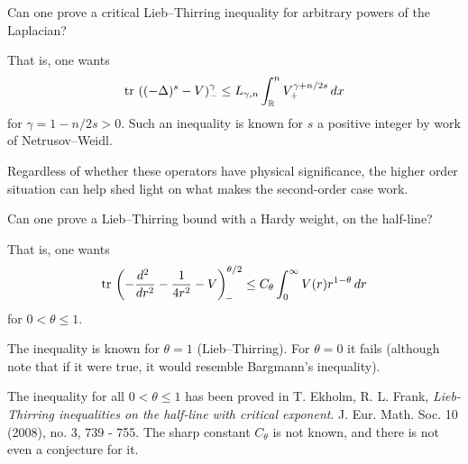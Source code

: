 \documentclass[12pt,letterpaper, reqno]{amsart}
\begin{document}
\begin{problemblock}

\begin{problem}
 Can one prove a critical Lieb--Thirring inequality for arbitrary powers of
the Laplacian?
\end{problem}

That is, one wants
\[
\text{tr\,} \left( (-\Delta)^s - V \right)_-^\gamma \leq
L_{\gamma,n} \int_\mathbb R^n V_+^{\gamma + n/2s} \, dx
\]
for $\gamma = 1 - n/2s > 0$. Such an inequality is known for $s$ a
positive integer by work of Netrusov--Weidl.


\begin{remark}
 Regardless of whether these operators have
physical significance, the higher order situation can help shed
light on what makes the second-order case work.
\end{remark}

\end{problemblock}


\begin{problemblock}

\begin{problem}
 Can one prove a Lieb--Thirring bound with a Hardy
weight, on the half-line?
\end{problem}

 That is, one wants
\[
\text{tr\,} \left( -\frac{d^2\ }{dr^2} - \frac{1}{4r^2} - V
\right)_{\! -}^{\theta/2}  \leq C_\theta \int_0^\infty V(r)
r^{1-\theta}\, dr
\]
for $0 < \theta \leq 1$.
\begin{remark}
The inequality is known for $\theta=1$
(Lieb--Thirring). For $\theta=0$ it fails (although note that if it
were true, it would resemble Bargmann's inequality).
\end{remark}

\begin{remark}
 The inequality for all $0 < \theta \leq 1$ has been
proved in T. Ekholm, R. L. Frank,  \emph{Lieb-Thirring inequalities on
the half-line with critical exponent}. J. Eur. Math. Soc. 10 (2008),
no. 3, 739 - 755. The sharp constant
$C_\theta$ is not known, and there is not even a conjecture for it.
\end{remark}

\end{problemblock}
\end{document}
